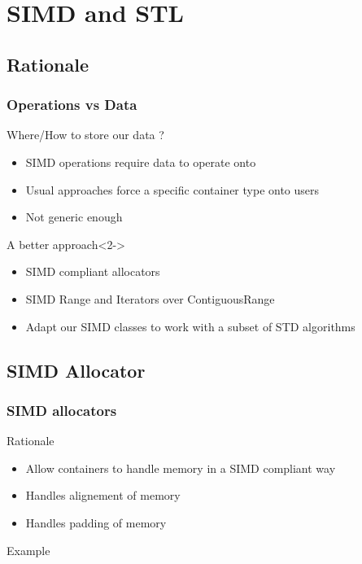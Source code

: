 \section{SIMD and STL}
\subsection{Rationale}
\frame
{
  \frametitle{Operations vs Data}
  \begin{block}{Where/How to store our data ?}
  \begin{itemize}
  \item SIMD operations require data to operate onto
  \item Usual approaches force a specific container type onto users
  \item Not generic enough
  \end{itemize}
  \end{block}{}

  \begin{block}{A better approach}<2->
  \begin{itemize}
  \item SIMD compliant allocators
  \item SIMD Range and Iterators over ContiguousRange
  \item Adapt our SIMD classes to work with a subset of STD algorithms
  \end{itemize}
  \end{block}{}
}


\subsection{SIMD Allocator}
\frame
{
  \frametitle{SIMD allocators}
  \begin{block}{Rationale}
  \begin{itemize}
  \item Allow containers to handle memory in a SIMD compliant way
  \item Handles alignement of memory
  \item Handles padding of memory
  \end{itemize}
  \end{block}{}

  \begin{block}{Example}
  \begin{center}
  \lstallocator
  \end{center}
  \end{block}{}
}

